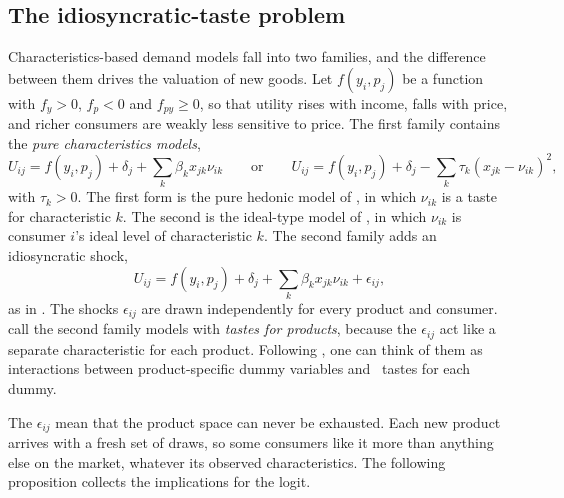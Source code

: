 \subsection{The idiosyncratic-taste problem}\label{sec:10-cs-epsilon}

Characteristics-based demand models fall into two families, and the difference between them drives the valuation
of new goods. Let $f(y_i,p_j)$ be a function with $f_y > 0$, $f_p < 0$ and $f_{py}\ge 0$, so that utility rises
with income, falls with price, and richer consumers are weakly less sensitive to price. The first family contains
the \emph{pure characteristics models},
\begin{equation}\label{eq:10-pure-classes}
U_{ij} = f(y_i,p_j) + \delta_j + \sum_k\beta_k x_{jk}\nu_{ik}
\qquad\text{or}\qquad
U_{ij} = f(y_i,p_j) + \delta_j - \sum_k\tau_k\left(x_{jk} - \nu_{ik}\right)^2 ,
\end{equation}
with $\tau_k > 0$. The first form is the pure hedonic model of \citet{BerryPakes2007}, in which $\nu_{ik}$ is a
taste for characteristic $k$. The second is the ideal-type model of \citet{AndersonDePalmaThisse1992}, in which
$\nu_{ik}$ is consumer $i$'s ideal level of characteristic $k$. The second family adds an idiosyncratic shock,
\begin{equation}\label{eq:10-blp-class}
U_{ij} = f(y_i,p_j) + \delta_j + \sum_k\beta_k x_{jk}\nu_{ik} + \epsilon_{ij},
\end{equation}
as in \citet{BerryLevinsohnPakes1995}. The shocks $\epsilon_{ij}$ are drawn independently for every product and
consumer.  call the second family models with \emph{tastes for products}, because the
$\epsilon_{ij}$ act like a separate characteristic for each product. Following \citet{CaplinNalebuff1991}, one
can think of them as interactions between product-specific dummy variables and \iid\ tastes for each dummy.

The $\epsilon_{ij}$ mean that the product space can never be exhausted. Each new product arrives with a fresh set
of draws, so some consumers like it more than anything else on the market, whatever its observed characteristics.
The following proposition collects the implications for the logit.

